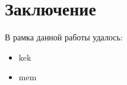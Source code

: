 \section*{Заключение}

В рамка данной работы удалось:
\begin{itemize}
    \item kek~\cite{fastspeech}
    \item mem
\end{itemize}